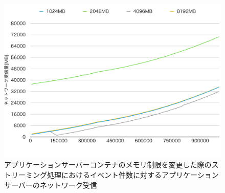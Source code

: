 \documentclass[../../../../../main]{subfiles}
\begin{document}
    \begin{figure}[H]
        \centering
        \includegraphics[width=12cm]{graph}
        \caption{アプリケーションサーバーコンテナのメモリ制限を変更した際のストリーミング処理におけるイベント件数に対するアプリケーションサーバーのネットワーク受信}
        \label{fig:stream-change-app-memory-limit-app-net-in-app_4_db_1_1024}
    \end{figure}
\end{document}
